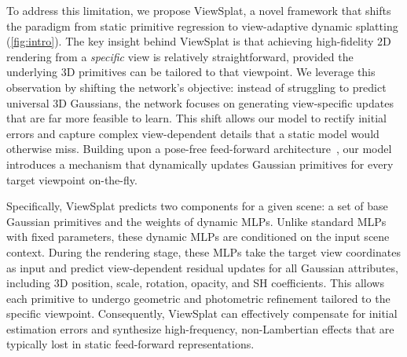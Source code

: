 \documentclass[runningheads]{llncs}
\newcommand{\hj}[1]{\textcolor{red}{{HJ:#1}}}
\begin{document}
To address this limitation, we propose ViewSplat, a novel framework that shifts the paradigm from static primitive regression to view-adaptive dynamic splatting (\cref{fig:intro}).
The key insight behind ViewSplat is that achieving high-fidelity 2D rendering from a \textit{specific} view is relatively straightforward, provided the underlying 3D primitives can be tailored to that viewpoint. We leverage this observation by shifting the network’s objective: instead of struggling to predict universal 3D Gaussians, the network focuses on generating view-specific updates that are far more feasible to learn.
This shift allows our model to rectify initial errors and capture complex view-dependent details that a static model would otherwise miss. Building upon a pose-free feed-forward architecture~\cite{huang2025spfsplat,huang2025spfsplatv2}, our model introduces a mechanism that dynamically updates Gaussian primitives for every target viewpoint on-the-fly.

Specifically, ViewSplat predicts two components for a given scene: a set of base Gaussian primitives and the weights of dynamic MLPs. Unlike standard MLPs with fixed parameters, these dynamic MLPs are conditioned on the input scene context. During the rendering stage, these MLPs take the target view coordinates as input and predict view-dependent residual updates for all Gaussian attributes, including 3D position, scale, rotation, opacity, and SH coefficients. This allows each primitive to undergo geometric and photometric refinement tailored to the specific viewpoint. Consequently, ViewSplat can effectively compensate for initial estimation errors and synthesize high-frequency, non-Lambertian effects that are typically lost in static feed-forward representations.

\end{document}
